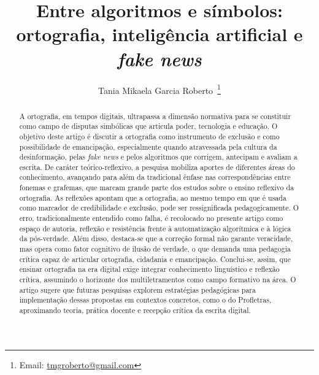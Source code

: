 \documentclass[portuguese]{textolivre}
\title{Entre algoritmos e símbolos: ortografia, inteligência artificial e \textit{fake news}}
\author[1]{Tania Mikaela Garcia Roberto~\orcid{0000-0002-6339-7602}\thanks{Email: \href{mailto:tmgroberto@gmail.com}{tmgroberto@gmail.com}}}
\affil[1]{Universidade Federal Rural do Rio de Janeiro, Seropédica, RJ, Brasil.}
\begin{document}
\maketitle

\begin{polyabstract}
\begin{abstract}
A ortografia, em tempos digitais, ultrapassa a dimensão normativa para se constituir como campo de disputas simbólicas que articula poder, tecnologia e educação. O objetivo deste artigo é discutir a ortografia como instrumento de exclusão e como possibilidade de emancipação, especialmente quando atravessada pela cultura da desinformação, pelas \textit{fake news} e pelos algoritmos que corrigem, antecipam e avaliam a escrita. De caráter teórico-reflexivo, a pesquisa mobiliza aportes de diferentes áreas do conhecimento, avançando para além da tradicional ênfase nas correspondências entre fonemas e grafemas, que marcam grande parte dos estudos sobre o ensino reflexivo da ortografia. As reflexões apontam que a ortografia, ao mesmo tempo em que é usada como marcador de credibilidade e exclusão, pode ser ressignificada pedagogicamente. O erro, tradicionalmente entendido como falha, é recolocado no presente artigo como espaço de autoria, reflexão e resistência frente à automatização algorítmica e à lógica da pós-verdade. Além disso, destaca-se que a correção formal não garante veracidade, mas opera como fator cognitivo de ilusão de verdade, o que demanda uma pedagogia crítica capaz de articular ortografia, cidadania e emancipação. Conclui-se, assim, que ensinar ortografia na era digital exige integrar conhecimento linguístico e reflexão crítica, assumindo o horizonte dos multiletramentos como campo formativo na área. O artigo sugere que futuras pesquisas explorem estratégias pedagógicas para implementação dessas propostas em contextos concretos, como o do Profletras, aproximando teoria, prática docente e recepção crítica da escrita digital.

\end{abstract}


\end{polyabstract}
\end{document}
